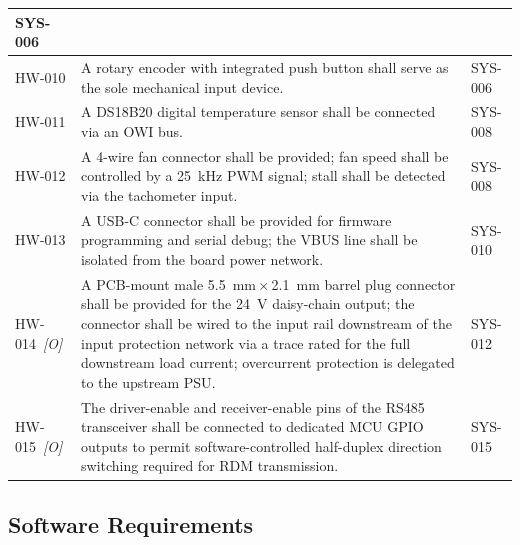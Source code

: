 \begin{longtable}{|p{1.8cm}|p{\dimexpr\linewidth-5.8cm-6\tabcolsep-4\arrayrulewidth\relax}|p{4cm}|}
      SYS-006 \\ \hline
    \label{req:hw010}HW-010 &
      A rotary encoder with integrated push button shall serve as the sole mechanical input device. &
      SYS-006 \\ \hline
    \label{req:hw011}HW-011 &
      A DS18B20 digital temperature sensor shall be connected via an \ac{OWI} bus. &
      SYS-008 \\ \hline
    \label{req:hw012}HW-012 &
      A 4-wire fan connector shall be provided; fan speed shall be controlled by a \SI{25}{\kilo\hertz} \ac{PWM} signal; stall shall be detected via the tachometer input. &
      SYS-008 \\ \hline
    \label{req:hw013}HW-013 &
      A \ac{USB}-C connector shall be provided for firmware programming and serial debug; the VBUS line shall be isolated from the board power network. &
      SYS-010 \\ \hline
    \label{req:hw014}HW-014~\textit{[O]} &
      A \ac{PCB}-mount male \SI{5.5}{\milli\metre}\,$\times$\,\SI{2.1}{\milli\metre} barrel plug connector shall be provided for the \SI{24}{\volt} daisy-chain output; the connector shall be wired to the input rail downstream of the input protection network via a trace rated for the full downstream load current; overcurrent protection is delegated to the upstream \ac{PSU}. &
      SYS-012 \\ \hline
    \label{req:hw015}HW-015~\textit{[O]} &
      The driver-enable and receiver-enable pins of the \ac{RS485} transceiver shall be connected to dedicated \ac{MCU} \ac{GPIO} outputs to permit software-controlled half-duplex direction switching required for \ac{RDM} transmission. &
      SYS-015 \\ \hline
\end{longtable}

\subsection{Software Requirements}
\label{sec:req_software}

